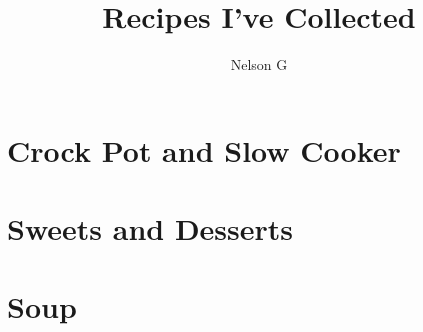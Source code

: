 \documentclass{book}
\title{Recipes I've Collected}
\author{Nelson G}
\begin{document}
\pagestyle{empty}
\maketitle
\tableofcontents

\pagestyle{main}



\chapter{Crock Pot and Slow Cooker}



















\chapter{Sweets and Desserts}






\chapter{Soup}

\end{document}
